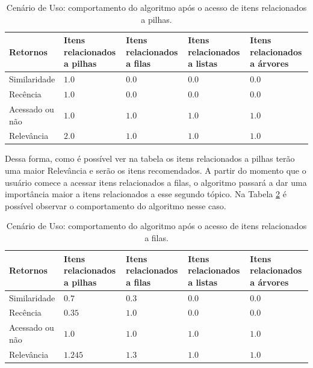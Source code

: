 \begin{table}[hp]
\footnotesize
\caption[Cenário de Uso: comportamento do algoritmo após o acesso de itens relacionados a pilhas.]{Cenário de Uso: comportamento do algoritmo após o acesso de itens relacionados a pilhas.}
\label{tab:cenario-de-uso-1}
\centering
\begin{tabular}{|p{2cm}|p{3cm}|p{3cm}|p{3cm}|p{3cm}|}
  \hline
  \textbf{Retornos} & \textbf{Itens relacionados a pilhas} & \textbf{Itens relacionados a filas} & \textbf{Itens relacionados a listas} & \textbf{Itens relacionados a árvores} \\
  \hline
  Similaridade & $1.0$ & $0.0$ & $0.0$ & $0.0$ \\
  \hline
  Recência & $1.0$ & $0.0$ & $0.0$ & $0.0$ \\
  \hline
  Acessado ou não & $1.0$ & $1.0$ & $1.0$ & $1.0$ \\
  \hline
  Relevância & $2.0$ & $1.0$ & $1.0$ & $1.0$ \\
  \hline
\end{tabular}
\end{table}

Dessa forma, como é possível ver na tabela os itens relacionados a pilhas terão uma maior Relevância e serão os itens recomendados.
A partir do momento que o usuário comece a acessar itens relacionados a filas, o algoritmo passará a dar uma importância
maior a itens relacionados a esse segundo tópico. Na Tabela \ref{tab:cenario-de-uso-2} é possível observar o
comportamento do algoritmo nesse caso.

\begin{table}[hp]
\footnotesize
\caption[Cenário de Uso: comportamento do algoritmo após o acesso de itens relacionados a filas.]{Cenário de Uso: comportamento do algoritmo após o acesso de itens relacionados a filas.}
\label{tab:cenario-de-uso-2}
\centering
\begin{tabular}{|p{2cm}|p{3cm}|p{3cm}|p{3cm}|p{3cm}|}
  \hline
  \textbf{Retornos} & \textbf{Itens relacionados a pilhas} & \textbf{Itens relacionados a filas} & \textbf{Itens relacionados a listas} & \textbf{Itens relacionados a árvores} \\
  \hline
  Similaridade & $0.7$ & $0.3$ & $0.0$ & $0.0$ \\
  \hline
  Recência & $0.35$ & $1.0$ & $0.0$ & $0.0$ \\
  \hline
  Acessado ou não & $1.0$ & $1.0$ & $1.0$ & $1.0$ \\
  \hline
  Relevância & $1.245$ & $1.3$ & $1.0$ & $1.0$ \\
  \hline
\end{tabular}
\end{table}

